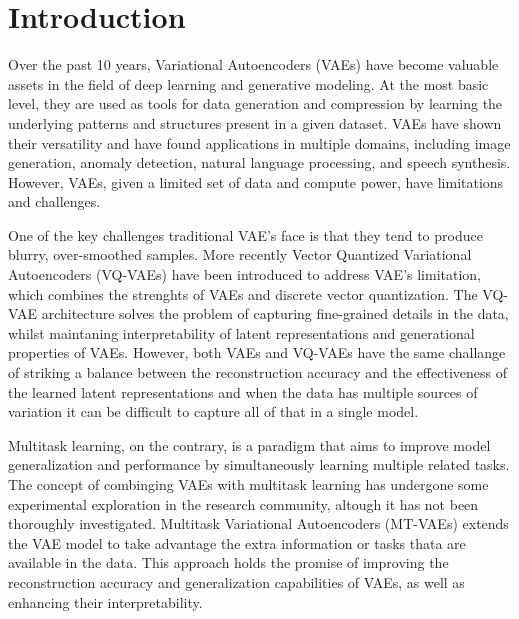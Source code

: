 \chapter{Introduction}

Over the past 10 years, Variational Autoencoders (VAEs) have become valuable assets in the field of deep learning and generative modeling. At the most basic level, they are used as tools for data generation and compression by learning the underlying patterns and structures present in a given dataset. VAEs have shown their versatility and have found applications in multiple domains, including image generation, anomaly detection, natural language processing, and speech synthesis. However, VAEs, given a limited set of data and compute power, have limitations and challenges.\cite{kingma2013autoencoding,Kingma_2019, vqvae, dalle}

One of the key challenges traditional VAE's face is that they tend to produce blurry, over-smoothed samples. More recently Vector Quantized Variational Autoencoders (VQ-VAEs) have been introduced to address VAE's limitation, which combines the strenghts of VAEs and discrete vector quantization.\cite{dalle} The VQ-VAE architecture solves the problem of capturing fine-grained details in the data, whilst maintaning interpretability of latent representations and generational properties of VAEs. However, both VAEs and VQ-VAEs have the same challange of striking a balance between the reconstruction accuracy and the effectiveness of the learned latent representations and when the data has multiple sources of variation it can be difficult to capture all of that in a single model.\cite{Kingma_2019,betavae, vqvae}

Multitask learning, on the contrary, is a paradigm that aims to improve model generalization and performance by simultaneously learning multiple related tasks. The concept of combinging VAEs with multitask learning has undergone some experimental exploration in the research community, altough it has not been thoroughly investigated.\cite{multitaskvib} Multitask Variational Autoencoders (MT-VAEs) extends the VAE model to take advantage the extra information or tasks thata are available in the data. This approach holds the promise of improving the reconstruction accuracy and generalization capabilities of VAEs, as well as enhancing their interpretability.\cite{multitasklearning}

